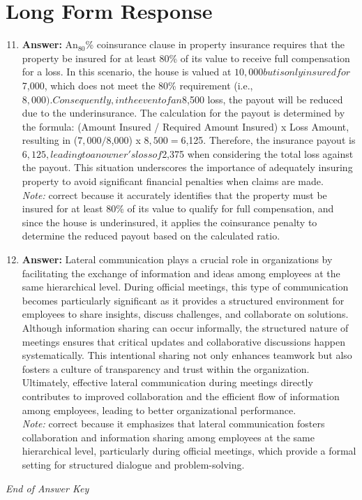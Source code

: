 \documentclass[12pt]{article}
\begin{document}
\section*{Long Form Response}
\begin{enumerate}[label=\arabic*.]
\setcounter{enumi}{10}
\item \textbf{Answer:} An$_{80}$\% coinsurance clause in property insurance requires that the property be insured for at least 80\% of its value to receive full compensation for a loss. In this scenario, the house is valued at $10,000 but is only insured for $7,000, which does not meet the 80\% requirement (i.e., $8,000). Consequently, in the event of an $8,500 loss, the payout will be reduced due to the underinsurance. The calculation for the payout is determined by the formula: (Amount Insured / Required Amount Insured) x Loss Amount, resulting in ($7,000 / $8,000) x $8,500 = $6,125. Therefore, the insurance payout is $6,125, leading to an owner's loss of $2,375 when considering the total loss against the payout. This situation underscores the importance of adequately insuring property to avoid significant financial penalties when claims are made.
\\ \textit{Note:} correct because it accurately identifies that the property must be insured for at least 80\% of its value to qualify for full compensation, and since the house is underinsured, it applies the coinsurance penalty to determine the reduced payout based on the calculated ratio.
\item \textbf{Answer:} Lateral communication plays a crucial role in organizations by facilitating the exchange of information and ideas among employees at the same hierarchical level. During official meetings, this type of communication becomes particularly significant as it provides a structured environment for employees to share insights, discuss challenges, and collaborate on solutions. Although information sharing can occur informally, the structured nature of meetings ensures that critical updates and collaborative discussions happen systematically. This intentional sharing not only enhances teamwork but also fosters a culture of transparency and trust within the organization. Ultimately, effective lateral communication during meetings directly contributes to improved collaboration and the efficient flow of information among employees, leading to better organizational performance.
\\ \textit{Note:} correct because it emphasizes that lateral communication fosters collaboration and information sharing among employees at the same hierarchical level, particularly during official meetings, which provide a formal setting for structured dialogue and problem-solving.
\end{enumerate}

\vfill
\noindent\textit{End of Answer Key}
\end{document}
